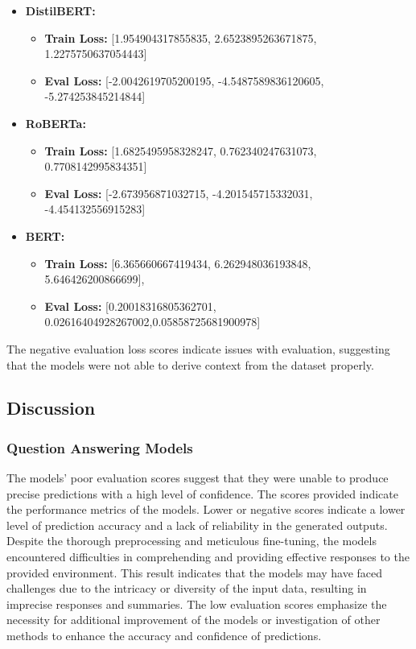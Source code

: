\documentclass[conference]{IEEEtran}
\begin{document}
    \begin{itemize}
        \item \textbf{DistilBERT:}
        \begin{itemize}
            \item \textbf{Train Loss:} [1.954904317855835, 2.6523895263671875, 1.2275750637054443]
            \item \textbf{Eval Loss:} [-2.0042619705200195, -4.5487589836120605, -5.274253845214844]
        \end{itemize}

        \item \textbf{RoBERTa:}
        \begin{itemize}
            \item \textbf{Train Loss:} [1.6825495958328247, 0.762340247631073, 0.7708142995834351]
            \item \textbf{Eval Loss:} [-2.673956871032715, -4.201545715332031, -4.454132556915283]
        \end{itemize}

        \item \textbf{BERT:}
        \begin{itemize}
            \item \textbf{Train Loss:} [6.365660667419434, 6.262948036193848, 5.646426200866699],

            \item \textbf{Eval Loss:} [0.20018316805362701, 0.02616404928267002,0.05858725681900978]
        \end{itemize}
    \end{itemize}

    The negative evaluation loss scores indicate issues with evaluation, suggesting that the models were not able to derive context from the dataset properly.

    \subsection{Discussion}

        \subsubsection{Question Answering Models}

            The models' poor evaluation scores suggest that they were unable to produce precise predictions with a high level of confidence. The scores provided indicate the performance metrics of the models. Lower or negative scores indicate a lower level of prediction accuracy and a lack of reliability in the generated outputs. Despite the thorough preprocessing and meticulous fine-tuning, the models encountered difficulties in comprehending and providing effective responses to the provided environment. This result indicates that the models may have faced challenges due to the intricacy or diversity of the input data, resulting in imprecise responses and summaries. The low evaluation scores emphasize the necessity for additional improvement of the models or investigation of other methods to enhance the accuracy and confidence of predictions.
\end{document}
